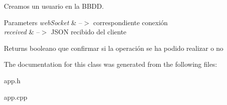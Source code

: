 Creamos un usuario en la B\+B\+DD. 


\begin{DoxyParams}{Parameters}
{\em web\+Socket} & --$>$ correspondiente conexión \\
\hline
{\em received} & --$>$ J\+S\+ON recibido del cliente \\
\hline
\end{DoxyParams}
\begin{DoxyReturn}{Returns}
booleano que confirmar si la operación se ha podido realizar o no 
\end{DoxyReturn}


The documentation for this class was generated from the following files\+:\begin{DoxyCompactItemize}
\item 
app.\+h\item 
app.\+cpp\end{DoxyCompactItemize}
